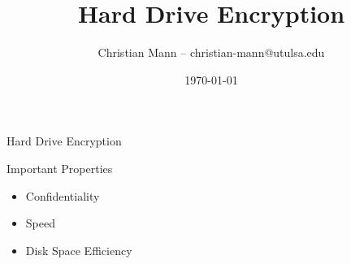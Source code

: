 \documentclass[12pt]{beamer}
\title[Introduction to Cryptography]{Hard Drive Encryption}
\author{Christian Mann -- christian-mann@utulsa.edu}
\institute{University of Tulsa\\
Tulsa, Oklahoma 74104}
\date{\today}
\begin{document}
\lstset{
language=python,                %
showspaces=false,               %
showstringspaces=false,         %
showtabs=false,                 %
tabsize=4,	                %
}

\newtheorem{mydef}{Definition}


\begin{frame}
\titlepage
\end{frame}

\begin{frame}{Hard Drive Encryption}{}
\begin{block}{Important Properties}
	\begin{itemize}
		\item Confidentiality
		\item Speed
		\item Disk Space Efficiency
	\end{itemize}
\end{block}
\end{frame}
\end{document}
